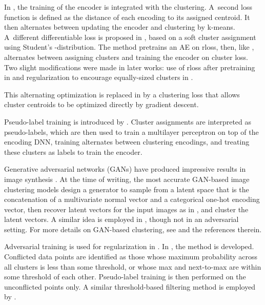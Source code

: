 \documentclass[runningheads]{llncs}
\begin{document}
In \cite{yang2017towards}, the training of the encoder is integrated with the clustering. A~second loss function is defined as the distance of each encoding to its assigned centroid. It then alternates between updating the encoder and clustering by k-means. A~different differentiable loss is proposed in \cite{xie2016unsupervised}, based on a soft cluster assignment using Student's -distribution. The method pretrains an AE on rloss, then, like \cite{yang2017towards}, alternates between assigning clusters and training the encoder on cluster loss. Two slight modifications were made in later works: use of rloss after pretraining in \cite{guo2017improved} and regularization to encourage equally-sized clusters in \cite{Dizaji_2017_ICCV}.

This alternating optimization is replaced in \cite{gao2020deep} by a clustering loss that allows cluster centroids to be optimized directly by gradient descent. 

Pseudo-label training is introduced by \cite{caron2018deep}. Cluster assignments are interpreted as pseudo-labels, which are then used to train a multilayer perceptron on top of the encoding DNN, training alternates between clustering encodings, and treating these clusters as labels to train the encoder.




Generative adversarial networks \cite{goodfellow2014generative} (GANs) have produced impressive results in image synthesis \cite{Karras_2019_CVPR,elgammal2017can,brock2018large}. At the time of writing, the most accurate GAN-based image clustering models \cite{Mukherjee2019ClusterGANL,ding2019clustering}  design a generator to sample from a latent space that is the concatenation of a multivariate normal vector and a categorical one-hot encoding vector, then recover latent vectors for the input images as in \cite{creswell2018inverting,lipton2017precise}, and cluster the latent vectors. A similar idea is employed in \cite{jiang2016variational}, though not in an adversarial setting. For more details on GAN-based clustering, see \cite{Zhou_2018_CVPR,zhao2018gan,ding2019clustering,Liang_2018_ECCV,wang2019wegan} and the references therein.

Adversarial training is used for regularization in \cite{mrabah2019adversarial}. In \cite{mrabah2019deep}, the method is developed. Conflicted data points are identified as those whose maximum probability across all clusters is less than some threshold, or whose max and next-to-max are within some threshold of each other. Pseudo-label training is then performed on the unconflicted points only. A similar threshold-based filtering method is employed by \cite{chang2017deep}. 
\end{document}
